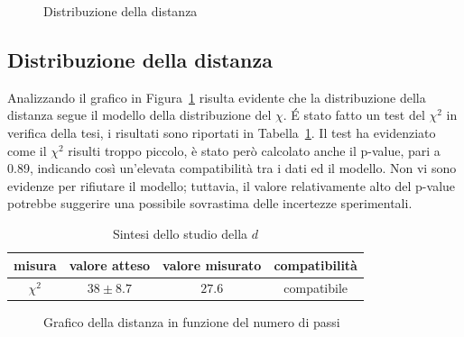 \documentclass[a4paper,12pt]{article}
\begin{document}
\begin{figure}
    \centering
    \sffamily
    \resizebox{0.85\textwidth}{!}{%
        
    }
    \caption{Distribuzione della distanza}%
    \label{fig:distribuzione_d}
\end{figure}

\subsection{Distribuzione della distanza}

Analizzando il grafico in Figura~\ref{fig:distribuzione_d} risulta evidente che la distribuzione della distanza segue il modello della distribuzione del $\chi$. \'E stato fatto un test del $\chi^2$ in verifica della tesi, i risultati sono riportati in Tabella~\ref{tab:sintesi_d}.
Il test ha evidenziato come il $\chi^2$ risulti troppo piccolo, è stato però calcolato anche il p-value, pari a 0.89, indicando così un'elevata compatibilità tra i dati ed il modello. Non vi sono evidenze per rifiutare il modello; tuttavia, il valore relativamente alto del p-value potrebbe suggerire una possibile sovrastima delle incertezze sperimentali.

\begin{table}[h!]
    \centering
    \begin{tabular}{c|c|c|c}
        \toprule
        misura   & valore atteso & valore misurato  & compatibilità            \\
        \midrule
        $\chi^2$ & $38 \pm 8.7$  & $27.6$           & compatibile\footnotemark[2]{} \\
        \bottomrule
    \end{tabular}
    \caption{Sintesi dello studio della $d$}%
    \label{tab:sintesi_d}
\end{table}


\begin{figure}
    \centering
    \sffamily
    \resizebox{0.85\textwidth}{!}{%
        
    }
    \caption{Grafico della distanza in funzione del numero di passi}%
    \label{fig:d_in_funzione_di_n}
\end{figure}
\end{document}
